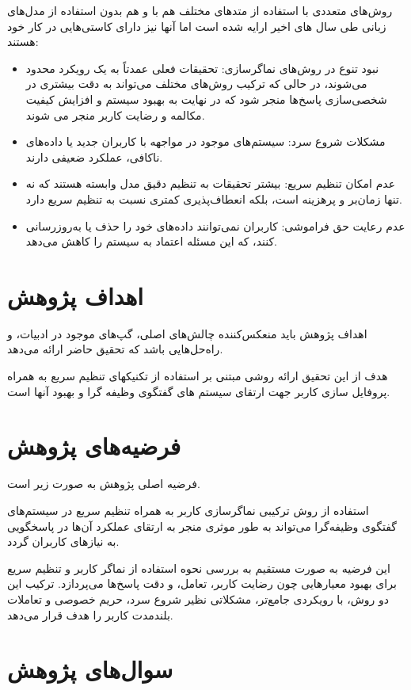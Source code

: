 روش‌های متعددی با استفاده از متدهای مختلف هم با و هم بدون استفاده از مدل‌های زبانی طی سال ‌های اخیر ارایه شده است اما آنها نیز دارای کاستی‌هایی در کار خود هستند:
\begin{itemize}
\item
نبود تنوع در روش‌های نماگر‌سازی: تحقیقات فعلی عمدتاً به یک رویکرد محدود می‌شوند، در حالی که ترکیب روش‌های مختلف می‌تواند به دقت بیشتری در شخصی‌سازی پاسخ‌ها منجر شود که در نهایت به بهبود سیستم و افزایش کیفیت مکالمه و رضایت کاربر منجر می شوند.
\item
مشکلات شروع سرد: سیستم‌های موجود در مواجهه با کاربران جدید یا داده‌های ناکافی، عملکرد ضعیفی دارند.
\item
عدم امکان تنظیم سریع: بیشتر تحقیقات به تنظیم دقیق مدل وابسته هستند که نه تنها زمان‌بر و پرهزینه است، بلکه انعطاف‌پذیری کمتری نسبت به تنظیم سریع دارد.
\item
عدم رعایت حق فراموشی: کاربران نمی‌توانند داده‌های خود را حذف یا به‌روزرسانی کنند، که این مسئله اعتماد به سیستم را کاهش می‌دهد.
\end{itemize}


\section{اهداف پژوهش}

اهداف پژوهش باید منعکس‌کننده چالش‌های اصلی، گپ‌های موجود در ادبیات، و راه‌حل‌هایی باشد که تحقیق حاضر ارائه می‌دهد. 

هدف از اين تحقیق ارائه روشی مبتنی بر استفاده از تکنیکهای تنظیم سريع به همراه پروفايل سازی کاربر جهت ارتقای سیستم های گفتگوی وظیفه گرا و بهبود آنها است.


\section{فرضیه‌های پژوهش}


فرضیه اصلی پژوهش به صورت زیر است.

استفاده از روش ترکیبی نماگر‌سازی کاربر به همراه تنظیم سریع در سیستم‌های گفتگوی وظیفه‌گرا می‌تواند به طور موثری منجر به ارتقای عملکرد آن‌ها در پاسخگویی به نیازهای کاربران گردد.

این فرضیه به صورت مستقیم به بررسی نحوه استفاده از نماگر کاربر و تنظیم سریع برای بهبود معیارهایی چون رضایت کاربر، تعامل، و دقت پاسخ‌ها می‌پردازد. ترکیب این دو روش، با رویکردی جامع‌تر، مشکلاتی نظیر شروع سرد، حریم خصوصی و تعاملات بلندمدت کاربر را هدف قرار می‌دهد.


\section{سوال‌های پژوهش}

